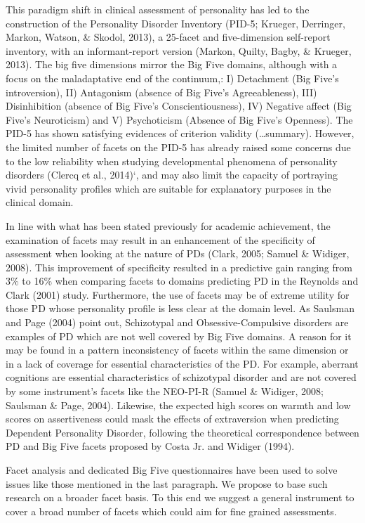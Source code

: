 \documentclass[,man]{apa6}
\theoremstyle{definition}
\theoremstyle{definition}
\theoremstyle{definition}
\theoremstyle{remark}
\begin{document}
This paradigm shift in clinical assessment of personality has led to the
construction of the Personality Disorder Inventory (PID-5; Krueger,
Derringer, Markon, Watson, \& Skodol, 2013), a 25-facet and
five-dimension self-report inventory, with an informant-report version
(Markon, Quilty, Bagby, \& Krueger, 2013). The big five dimensions
mirror the Big Five domains, although with a focus on the maladaptative
end of the continuum,: I) Detachment (Big Five's introversion), II)
Antagonism (absence of Big Five's Agreeableness), III) Disinhibition
(absence of Big Five's Conscientiousness), IV) Negative affect (Big
Five's Neuroticism) and V) Psychoticism (Absence of Big Five's
Openness). The PID-5 has shown satisfying evidences of criterion
validity (\ldots{}summary). However, the limited number of facets on the
PID-5 has already raised some concerns due to the low reliability when
studying developmental phenomena of personality disorders (Clercq et
al., 2014)`, and may also limit the capacity of portraying vivid
personality profiles which are suitable for explanatory purposes in the
clinical domain.

In line with what has been stated previously for academic achievement,
the examination of facets may result in an enhancement of the
specificity of assessment when looking at the nature of PDs (Clark,
2005; Samuel \& Widiger, 2008). This improvement of specificity resulted
in a predictive gain ranging from 3\% to 16\% when comparing facets to
domains predicting PD in the Reynolds and Clark (2001) study.
Furthermore, the use of facets may be of extreme utility for those PD
whose personality profile is less clear at the domain level. As Saulsman
and Page (2004) point out, Schizotypal and Obsessive-Compulsive
disorders are examples of PD which are not well covered by Big Five
domains. A reason for it may be found in a pattern inconsistency of
facets within the same dimension or in a lack of coverage for essential
characteristics of the PD. For example, aberrant cognitions are
essential characteristics of schizotypal disorder and are not covered by
some instrument's facets like the NEO-PI-R (Samuel \& Widiger, 2008;
Saulsman \& Page, 2004). Likewise, the expected high scores on warmth
and low scores on assertiveness could mask the effects of extraversion
when predicting Dependent Personality Disorder, following the
theoretical correspondence between PD and Big Five facets proposed by
Costa Jr. and Widiger (1994).

Facet analysis and dedicated Big Five questionnaires have been used to
solve issues like those mentioned in the last paragraph. We propose to
base such research on a broader facet basis. To this end we suggest a
general instrument to cover a broad number of facets which could aim for
fine grained assessments.
\end{document}
